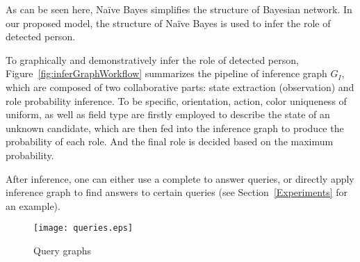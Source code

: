 As can be seen here, Na\"{i}ve Bayes simplifies the structure of Bayesian network. In our proposed model, the structure of Na\"{i}ve Bayes is used to infer %
the role of detected person.   %



To graphically and demonstratively infer the role of detected person,  Figure~\ref{fig:inferGraphWorkflow} summarizes the pipeline of inference graph $G_I$, which are composed of two collaborative parts: state extraction (observation) and role probability inference. To be specific, orientation, action, color uniqueness of uniform, as well as field type are firstly employed to describe the state of an unknown candidate, which are then fed into the inference graph to produce the probability of each role. 
And the final role is decided based on the maximum probability. 

After inference, one can either use a complete  to answer queries, or directly apply inference graph to find answers to certain queries (see Section~\ref{Experiments} for an example). 


\begin{figure}[tb!]
\centering
\texttt{[image: queries.eps]}
\caption{Query graphs}
\label{fig:queries}
\end{figure}